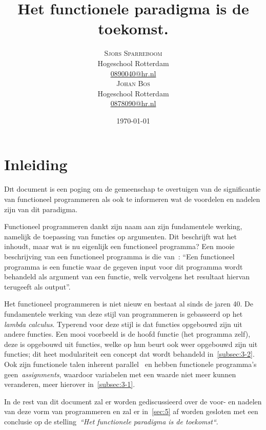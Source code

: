 \documentclass[twoside,twocolumn]{article}
\title{Het functionele paradigma is de toekomst.} %
\author{%
  \textsc{Sjors Sparreboom} \\[1ex] %
\normalsize Hogeschool Rotterdam \\ %
\normalsize \href{mailto:0890040@hr.nl}{0890040@hr.nl} \\[2ex] %
\textsc{Johan Bos} \\[1ex] %
\normalsize Hogeschool Rotterdam \\ %
\normalsize \href{mailto:0878090@hr.nl}{0878090@hr.nl} %
}
\date{\today} %
\begin{document}
\nocite{*}

\maketitle


\section{Inleiding}
\label{sec:1}
\lettrine[nindent=0em,lines=3]{D}it document is een poging om de gemeenschap te
overtuigen van de significantie van functioneel programmeren als ook te
informeren wat de voordelen en nadelen zijn van dit paradigma.

Functioneel programmeren dankt zijn naam aan zijn fundamentele werking,
namelijk de toepassing van functies op argumenten. Dit beschrijft wat
het inhoudt, maar wat is nu eigenlijk een functioneel programma? Een
mooie beschrijving van een functioneel programma is die van~\textcite{src1}:
\enquote{Een functioneel programma is een functie waar de gegeven input voor
dit programma wordt behandeld als argument van een functie, welk vervolgens het
resultaat hiervan terugeeft als output}.

Het functioneel programmeren is niet nieuw en bestaat al sinds de jaren 40. De
fundamentele werking van deze stijl van programmeren is gebasseerd op
het \textit{lambda calculus}\cite{src2,src3}. Typerend voor deze stijl is dat
functies opgebouwd zijn uit andere functies. Een mooi voorbeeld is de hoofd
functie (het programma zelf), deze is opgebouwd uit functies, welke op hun
beurt ook weer opgebouwd zijn uit functies; dit heet modulariteit een concept
dat wordt behandeld in~\cref{subsec:3-2}. Ook zijn functionele talen inherent
parallel~\cite{src4,src12} en hebben functionele programma's
geen~\textit{assignments}, waardoor variabelen met een waarde niet meer kunnen
veranderen, meer hierover in~\cref{subsec:3-1}.

In de rest van dit document zal er worden gediscussieerd over de voor- en
nadelen van deze vorm van programmeren en zal er in~\cref{sec:5} af worden
gesloten met een conclusie op de stelling~\textit{``Het functionele paradigma
is de toekomst``}.

\end{document}
